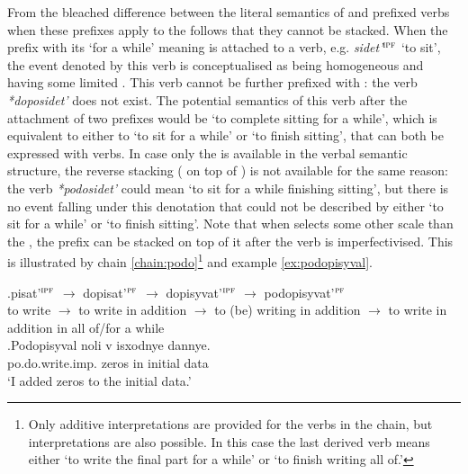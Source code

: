From the bleached difference between the literal semantics of  and prefixed verbs when these prefixes apply to the  follows that they cannot be stacked. When the prefix  with its `for a while' meaning is attached to a verb, e.g. \textit{sidet'}$^{\textsc{ipf}}$ `to sit', the event denoted by this verb is conceptualised as being homogeneous and having some limited . This verb cannot be further prefixed with : the verb \textit{*doposidet'} does not exist. The potential semantics of this verb after the attachment of two prefixes would be `to complete sitting for a while', which is equivalent to either to `to sit for a while' or `to finish sitting', that can both be expressed with  verbs. In case only the  is available in the verbal semantic structure, the reverse stacking ( on top of ) is not available for the same reason: the verb \textit{*podosidet'} could mean `to sit for a while finishing sitting', but there is no event falling under this denotation that could not be described by either `to sit for a while' or `to finish sitting'. Note that when  selects some other scale than the , the prefix  can be stacked on top of it after the verb is imperfectivised. This is illustrated by chain \ref{chain:podo}{\footnote{Only additive interpretations are provided for the verbs in the chain, but  interpretations are also possible. In this case the last derived verb means either `to write the final part for a while' or `to finish writing all of.'}} and example \ref{ex:podopisyval}.

\exg.\label{chain:podo}pisat'$^{\textsc{ipf}}$ $\rightarrow$ dopisat'$^{\textsc{pf}}$ $\rightarrow$ dopisyvat'$^{\textsc{ipf}}$ $\rightarrow$ podopisyvat'$^{\textsc{pf}}$\\
{to write} $\rightarrow$ {to write in addition} $\rightarrow$ {to (be) writing in addition} $\rightarrow$ {to write in addition in all of/for a while}\\

\exg.\label{ex:podopisyval}Podopisyval noli v isxodnye dannye.\\
po.do.write.imp. zeros in initial data\\
\trans `I added zeros to the initial data.'

